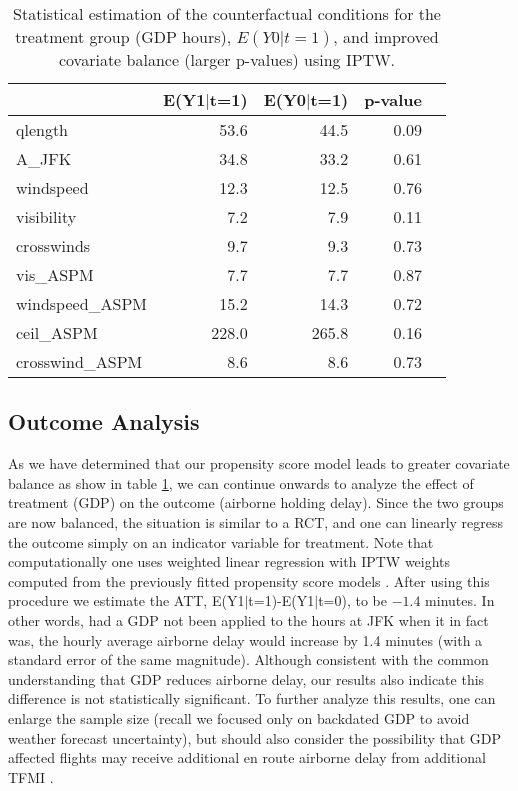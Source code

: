 \documentclass[conference]{IEEEtran}
\begin{document}
\begin{table}[ht]
\centering
\begin{tabular}{lrrrr}
  \hline
 & E(Y1$|$t=1) & \textbf{E(Y0$|$t=1)} & p-value \\ 
  \hline
qlength & 53.6 & 44.5 & 0.09  \\ 
  A\_JFK & 34.8 & 33.2 & 0.61 \\ 
  windspeed & 12.3 & 12.5 & 0.76 \\ 
  visibility & 7.2 & 7.9 & 0.11  \\ 
  crosswinds & 9.7 & 9.3 & 0.73  \\ 
  vis\_ASPM & 7.7 & 7.7 & 0.87  \\ 
  windspeed\_ASPM & 15.2 & 14.3 & 0.72  \\ 
  ceil\_ASPM & 228.0 & 265.8 & 0.16  \\ 
  crosswind\_ASPM & 8.6 & 8.6 & 0.73  \\ 
   \hline
\end{tabular}
\caption{Statistical estimation of the counterfactual conditions for the treatment group (GDP hours), \textbf{$E(Y0|t=1)$}, and improved covariate balance (larger p-values) using IPTW.} 
\label{tab:balance}
\end{table}
 
\subsection{Outcome Analysis}
As we have determined that our propensity score model leads to greater covariate balance as show in table \ref{tab:balance}, we can continue onwards to analyze the effect of treatment (GDP) on the outcome (airborne holding delay). Since the two groups are now balanced, the situation is similar to a RCT, and one can linearly regress the outcome simply on an indicator variable for treatment. Note that computationally one uses weighted linear regression with IPTW weights computed from the previously fitted propensity score models \cite{ridgeway2015toolkit}. After using this procedure we estimate the ATT, E(Y1$|$t=1)-E(Y1$|$t=0), to be $-1.4$ minutes.  In other words, had a GDP not been applied to the hours at JFK when it in fact was, the hourly average airborne delay would increase by 1.4 minutes (with a standard error of the same magnitude).  Although consistent with the common understanding that GDP reduces airborne delay, our results also indicate this difference is not statistically significant.  To further analyze this results, one can enlarge the sample size (recall we focused only on backdated GDP to avoid weather forecast uncertainty), but should also consider the possibility that GDP affected flights may receive additional en route airborne delay from additional TFMI \cite{bilimoria2016analysis}. 
\end{document}
